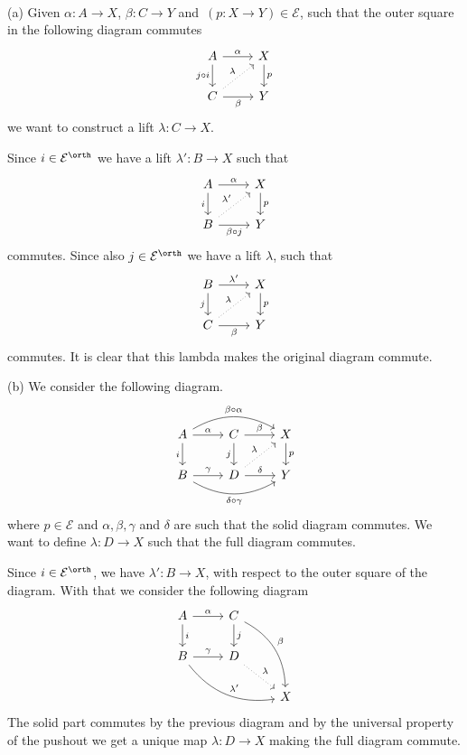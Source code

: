 
\def\Eps{\mathcal{E}}


\mmaketitle

\begin{exercise}[1]\ 

(a)
Given $\alpha: A \to X$, $\beta : C \to Y$ and $(p : X\to Y) \in \Eps$, such
that the outer square in the following diagram commutes
\[ \begin{tikzcd}
A \ar[r,"\alpha"] \ar[d, "j \circ i"'] 
& X \ar[d, "p"] \\
C \ar[r, "\beta"'] \ar[ru, dotted, "\lambda"]
& Y
\end{tikzcd}
\]
we want to construct a lift $\lambda:C\to X$.

Since $i \in \Eps^\orth$ we have a lift $\lambda':B\to X$ such that 
\[ \begin{tikzcd}
A \ar[r,"\alpha"] \ar[d, "i"'] 
& X \ar[d, "p"] \\
B \ar[r, "\beta \circ j"'] \ar[ru, dotted, "\lambda'"]
& Y
\end{tikzcd} \]
commutes. Since also $j\in \Eps^\orth$ we have a lift $\lambda$, such that 
\[ \begin{tikzcd}
B \ar[r,"\lambda'"] \ar[d, "j"'] 
& X \ar[d, "p"] \\
C \ar[r, "\beta"'] \ar[ru, dotted, "\lambda"]
& Y
\end{tikzcd} \]
commutes. It is clear that this lambda makes the original diagram commute.

(b)
We consider the following diagram.
\[ \begin{tikzcd}
A \ar[r, "\alpha"] \ar[rr, bend left, "\beta \circ \alpha"] 
\ar[d, "i"'] 
& C \ar[r, "\beta"] \ar[d, "j"'] 
& X \ar[d, "p"]
\\ 
B \ar[r, "\gamma"] \ar[rr, bend right, "\delta \circ \gamma"'] 
& D \ar[r, "\delta"] 
\ar[ru, dotted, "\lambda"]
& Y
\end{tikzcd} \]
where $p\in \Eps$ and $\alpha, \beta, \gamma$ and $\delta$ are such that
the solid diagram commutes. 
We want to define $\lambda : D \to X$ such that the
full diagram commutes.

Since $i \in \Eps^\orth$, we have $\lambda' : B \to X$, with respect to the
outer square of the diagram. With that we consider the following diagram
\[ \begin{tikzcd}
A \ar[r,"\alpha"] \ar[d, "i"] 
& C \ar[d, "j"] \ar[rdd, bend left, "\beta"] 
& \\
B \ar[r, "\gamma"] \ar[rrd, bend right, "\lambda'"] 
& D \ar[rd, dotted, "\lambda"]
& \\ 
& & X
\end{tikzcd} \]
The solid part commutes by the previous diagram and
by the universal property of the pushout we get a unique map
$\lambda:D\to X$ making the full diagram commute.


\end{exercise}
